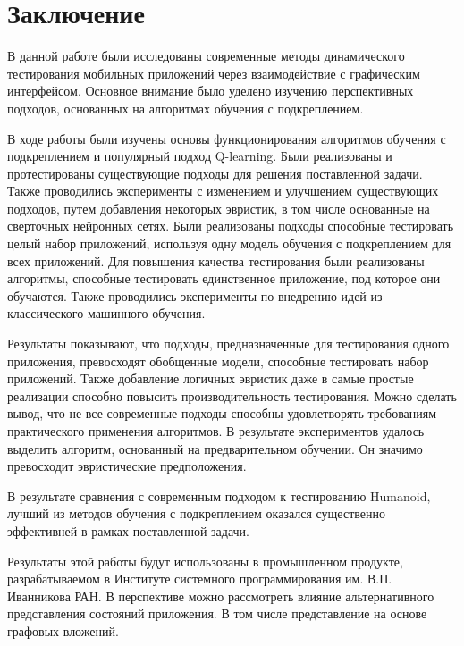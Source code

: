 \section{Заключение}
\label{sec:Chapter5} 

В данной работе были исследованы современные методы динамического тестирования мобильных приложений через взаимодействие с графическим интерфейсом. Основное внимание было уделено изучению перспективных подходов, основанных на алгоритмах обучения с подкреплением.

В ходе работы были изучены основы функционирования алгоритмов обучения с подкреплением и популярный подход Q-learning. Были реализованы и протестированы существующие подходы для решения поставленной задачи. Также проводились эксперименты с изменением и улучшением существующих подходов, путем добавления некоторых эвристик, в том числе основанные на сверточных нейронных сетях. Были реализованы подходы способные тестировать целый набор приложений, используя одну модель обучения с подкреплением для всех приложений. Для повышения качества тестирования были реализованы алгоритмы, способные тестировать единственное приложение, под которое они обучаются. Также проводились эксперименты по внедрению идей из классического машинного обучения.

Результаты показывают, что подходы, предназначенные для тестирования одного приложения, превосходят обобщенные модели, способные тестировать набор приложений. Также добавление логичных эвристик даже в самые простые реализации способно повысить производительность тестирования. Можно сделать вывод, что не все современные подходы способны удовлетворять требованиям практического применения алгоритмов. В результате экспериментов удалось выделить алгоритм, основанный на предварительном обучении. Он значимо превосходит эвристические предположения.

В результате сравнения с современным подходом к тестированию Humanoid, лучший из методов обучения с подкреплением оказался существенно эффективней в рамках поставленной задачи.

Результаты этой работы будут использованы в промышленном продукте, разрабатываемом в Институте системного программирования им. В.П. Иванникова РАН. В перспективе можно рассмотреть влияние альтернативного представления состояний приложения. В том числе представление на основе графовых вложений.
